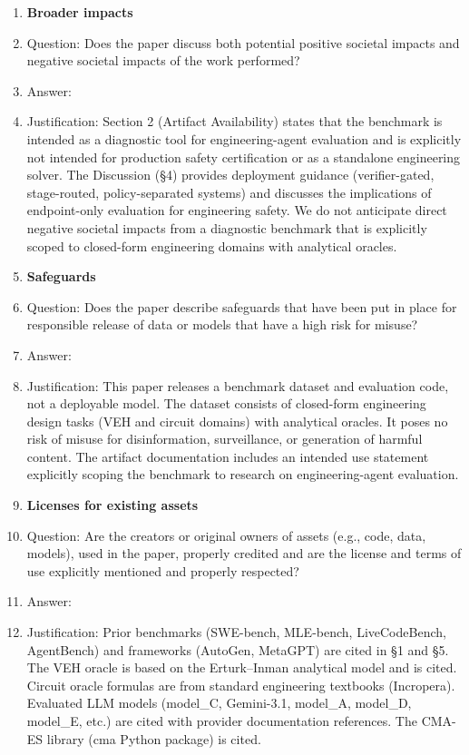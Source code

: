 \begin{enumerate}
\item {\bf Broader impacts}
    \item[] Question: Does the paper discuss both potential positive societal impacts and negative societal impacts of the work performed?
    \item[] Answer: \answerYes{}
    \item[] Justification: Section 2 (Artifact Availability) states that the benchmark is intended as a diagnostic tool for engineering-agent evaluation and is explicitly not intended for production safety certification or as a standalone engineering solver. The Discussion (§4) provides deployment guidance (verifier-gated, stage-routed, policy-separated systems) and discusses the implications of endpoint-only evaluation for engineering safety. We do not anticipate direct negative societal impacts from a diagnostic benchmark that is explicitly scoped to closed-form engineering domains with analytical oracles.

\item {\bf Safeguards}
    \item[] Question: Does the paper describe safeguards that have been put in place for responsible release of data or models that have a high risk for misuse?
    \item[] Answer: \answerNA{}
    \item[] Justification: This paper releases a benchmark dataset and evaluation code, not a deployable model. The dataset consists of closed-form engineering design tasks (VEH and circuit domains) with analytical oracles. It poses no risk of misuse for disinformation, surveillance, or generation of harmful content. The artifact documentation includes an intended use statement explicitly scoping the benchmark to research on engineering-agent evaluation.

\item {\bf Licenses for existing assets}
    \item[] Question: Are the creators or original owners of assets (e.g., code, data, models), used in the paper, properly credited and are the license and terms of use explicitly mentioned and properly respected?
    \item[] Answer: \answerYes{}
    \item[] Justification: Prior benchmarks (SWE-bench, MLE-bench, LiveCodeBench, AgentBench) and frameworks (AutoGen, MetaGPT) are cited in §1 and §5. The VEH oracle is based on the Erturk--Inman analytical model and is cited. Circuit oracle formulas are from standard engineering textbooks (Incropera). Evaluated LLM models (model_C, Gemini-3.1, model_A, model_D, model_E, etc.) are cited with provider documentation references. The CMA-ES library (cma Python package) is cited.


\end{enumerate}
